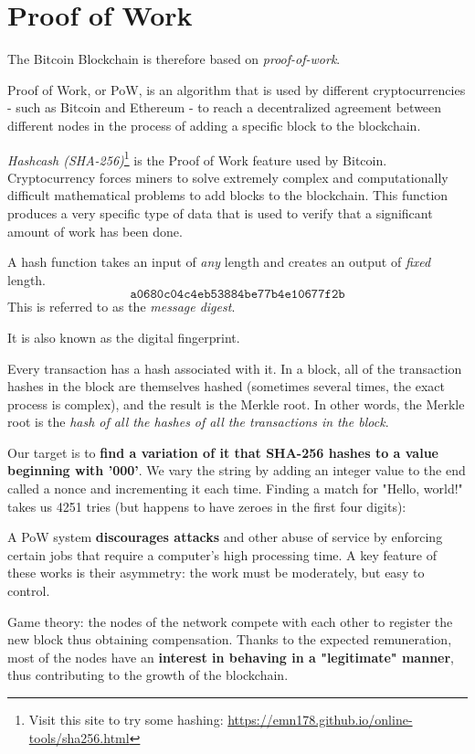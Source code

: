 \section{Proof of Work}

The Bitcoin Blockchain is therefore based on \textit{proof-of-work}.

Proof of Work, or PoW, is an algorithm that is used by different cryptocurrencies - such as Bitcoin and Ethereum - to reach a decentralized agreement between different nodes in the process of adding a specific block to the blockchain.

\textit{Hashcash (SHA-256)}\footnote{Visit this site to try some hashing: \url{https://emn178.github.io/online-tools/sha256.html}} is the Proof of Work feature used by Bitcoin. Cryptocurrency forces miners to solve extremely complex and computationally difficult mathematical problems to add blocks to the blockchain. This function produces a very specific type of data that is used to verify that a significant amount of work has been done.

A hash function takes an input of \textit{any} length and creates an output of \textit{fixed} length. 
\begin{equation*}
	\texttt{a0680c04c4eb53884be77b4e10677f2b}
\end{equation*}
This is referred to as the \textit{message digest}.

It is also known as the digital fingerprint.

Every transaction has a hash associated with it. In a block, all of the transaction hashes in the block are themselves hashed (sometimes several times, the exact process is complex), and the result is the Merkle root. In other words, the Merkle root is the \textit{hash of all the hashes of all the transactions in the block}. 

Our target is to \textbf{find a variation of it that SHA-256 hashes to a value beginning with '000'}. We vary the string by adding an integer value to the end called a nonce and incrementing it each time. Finding a match for "Hello, world!" takes us 4251 tries (but happens to have zeroes in the first four digits):

A PoW system \textbf{discourages attacks} and other abuse of service by enforcing certain jobs that require a computer's high processing time. A key feature of these works is their asymmetry: the work must be moderately, but easy to control.

Game theory: the nodes of the network compete with each other to register the new block thus obtaining compensation. Thanks to the expected remuneration, most of the nodes have an \textbf{interest in behaving in a "legitimate" manner}, thus contributing to the growth of the blockchain.

